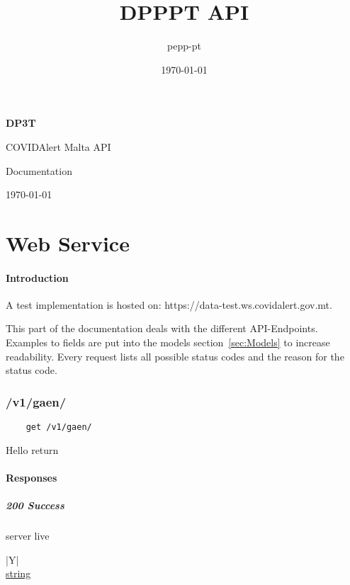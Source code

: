 \documentclass[a4paper
]{ubarticle}
\title{DPPPT API}
\date{\today}
\author{pepp-pt}
\begin{document}
\begin{titlepage}
	\hspace{4.3cm}
 {\raggedleft
	 \textbf{DP3T} \\
\vspace{0.3cm}
	 
\par}
	\vspace{3cm}
	{\Huge COVIDAlert Malta API \par}
	\vspace{1.5cm}
	{\huge Documentation \par}
	\vspace{3cm}
	{ \large \today }
	\end{titlepage}
\thispagestyle{empty}
\clearpage
\tableofcontents
\clearpage

\part{Web Service}
\subsection{Introduction}
A test implementation is hosted on: https://data-test.ws.covidalert.gov.mt. 

This part of the documentation deals with the different API-Endpoints. Examples to fields are put into the models section~\ref{sec:Models} to increase readability. Every request lists all possible status codes and the reason for the status code.
\section{ /v1/gaen/ }
    \begin{verbatim}
    get /v1/gaen/
    \end{verbatim}
Hello return

\subsection{Responses}
\subsubsection{ 200 Success }
server live
 

    
        \begin{ubresponses}{\textwidth}{|Y|}
        \\
        \hline
             \hyperref[sec:string] { string } \\
 \hline

        \end{ubresponses}
    
\end{document}
